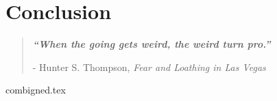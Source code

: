 

\chapter{ Conclusion }\label{ch6}


\cleardoublepage{}
\blankpage
\restoregeometry
\vspace*{0.15\paperheight}


\begin{center}
\begin{quotation}
  \large{\emph{\textbf{``When the going gets weird, the weird turn pro.''} }  }  \\
  \begin{flushright}
  - Hunter S. Thompson, \textit{Fear and Loathing in Las Vegas}
  \end{flushright}
 \end{quotation}
\end{center}
\doublespacing



 \onehalfspacing

%
 \newpage

%
{combigned.tex}
%
